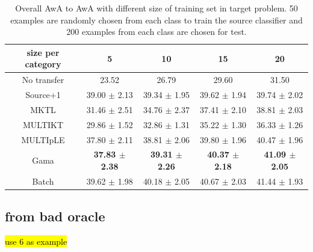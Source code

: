\begin{table}[htbp]
  \centering
  \caption{Overall AwA to AwA with different size of training set in target problem. 50 examples are randomly chosen from each class to train the source classifier and 200 examples from each class are chosen for test.}
    \begin{tabular}{ccccc}
    \toprule
     size per category    & 5     & 10    & 15    & 20 \\
    \midrule
    No transfer &         23.52  &         26.79  &         29.60  &         31.50  \\
    Source+1    &         39.00 $\pm$ 2.13 &         39.34 $\pm$ 1.95 &         39.62 $\pm$ 1.94 &         39.74 $\pm$ 2.02 \\
    MKTL        &         31.46 $\pm$ 2.51 &         34.76 $\pm$ 2.37 &         37.41 $\pm$ 2.10 &         38.81 $\pm$ 2.03 \\
    MULTIKT     &         29.86 $\pm$ 1.52 &         32.86 $\pm$ 1.31 &         35.22 $\pm$ 1.30 &         36.33 $\pm$ 1.26 \\
    MULTIpLE    &         37.80 $\pm$ 2.11 &         38.81 $\pm$ 2.06 &         39.80 $\pm$ 1.96 &         40.47 $\pm$ 1.96 \\
    Gama        &        \textbf{37.83 $\pm$ 2.38} &         \textbf{39.31 $\pm$ 2.26} &         \textbf{40.37 $\pm$ 2.18} &         \textbf{41.09 $\pm$ 2.05} \\
        \midrule
    Batch       &         39.62 $\pm$ 1.98 &         40.18 $\pm$ 2.05 &         40.67 $\pm$ 2.03 &         41.44 $\pm$ 1.93 \\
    \bottomrule
    \end{tabular}%
  \label{tab:A2A}%
\end{table}%



\subsection{from bad oracle}
\hl{use 6 as example}

